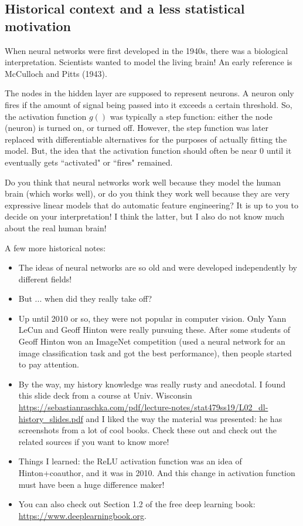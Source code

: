 \subsection{Historical context and a less statistical motivation}

When neural networks were first developed in the 1940s, there was a biological interpretation. Scientists wanted to model the living brain! An early reference is McCulloch and Pitts (1943). 

The nodes in the hidden layer are supposed to represent neurons. A neuron only fires if the amount of signal being passed into it exceeds a certain threshold. So, the activation function $g()$ was typically a step function: either the node (neuron) is turned on, or turned off. However, the step function was later replaced with differentiable alternatives for the purposes of actually fitting the model. But, the idea that the activation function should often be near 0 until it eventually gets ``activated" or ``fires" remained. 

Do you think that neural networks work well because they model the human brain (which works well), or do you think they work well because they are very expressive linear models that do automatic feature engineering? It is up to you to decide on your interpretation! I think the latter, but I also do not know much about the real human brain! 

A few more historical notes:
\begin{itemize}
\item The ideas of neural networks are so old and were developed independently by different fields!
\item But ... when did they really take off?
\item Up until 2010 or so, they were not popular in computer vision. Only Yann LeCun and Geoff Hinton were really pursuing these. After some students of Geoff Hinton won an ImageNet competition (used a neural network for an image classification task and got the best performance), then people started to pay attention.
\item By the way, my history	 knowledge was really rusty and anecdotal. I found this slide deck from a course at Univ. Wisconsin \url{https://sebastianraschka.com/pdf/lecture-notes/stat479ss19/L02_dl-history_slides.pdf} and I liked the way the material was presented: he has screenshots from a lot of cool books. Check these out and check out the related sources if you want to know more!
\item Things I learned: the ReLU activation function was an idea of Hinton+coauthor, and it was in 2010. And this change in activation function must have been a huge difference maker! 
\item You can also check out Section 1.2 of the free deep learning book: \url{https://www.deeplearningbook.org}. 
\end{itemize}



